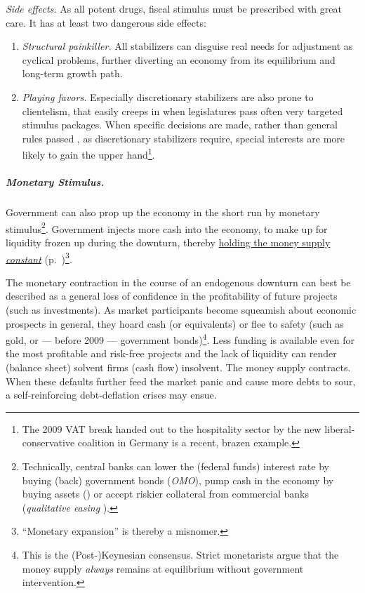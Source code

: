 \emph{Side effects.} As all potent drugs, fiscal stimulus must be prescribed with great care. It has at least two dangerous side effects:
\begin{enumerate}
	\item \emph{Structural painkiller.} All stabilizers can disguise real needs for adjustment as cyclical problems, further diverting an economy from its equilibrium and long-term growth path.  
	\item \emph{Playing favors.} Especially discretionary stabilizers are also prone to clientelism, that easily creeps in when legislatures pass often very targeted stimulus packages. When specific decisions are made, rather than general rules passed \citep{Weber-1918-aa}, as discretionary stabilizers require, special interests are more likely to gain the upper hand\footnote{
		The 2009 VAT break handed out to the hospitality sector by the new liberal-conservative coalition in Germany is a recent, brazen example.}.
\end{enumerate}

\subparagraph{Monetary Stimulus.}  \label{sec:monetary-stimulus}
Government can also prop up the economy in the short run by monetary stimulus\footnote{
	Technically, central banks can lower the (federal funds) interest rate by buying (back) government bonds (\emph{\gls{OMO}}), pump cash in the economy by buying assets () or accept riskier collateral from commercial banks (\emph{qualitative easing} \citep{Buiter2008}).}. 
Government injects more cash into the economy, to make up for liquidity frozen up during the downturn, thereby \hyperref[sec:price-stability]{holding the money supply \emph{constant}} (p.~\pageref{sec:price-stability})\footnote{
	``Monetary expansion'' is thereby a misnomer.}.

The monetary contraction in the course of an endogenous downturn can best be described as a general loss of confidence in the profitability of future projects (such as investments). As market participants become squeamish about economic prospects in general, they hoard cash (or equivalents) or flee to safety (such as gold, or --- before 2009 --- government bonds)\footnote{
	This is the (Post-)Keynesian consensus. Strict monetarists argue that the money supply \emph{always} remains at equilibrium without government intervention.}. 
Less funding is available even for the most profitable and risk-free projects and the lack of liquidity can render (balance sheet) solvent firms (cash flow) insolvent. The money supply contracts. When these defaults further feed the market panic and cause more debts to sour, a self-reinforcing debt-deflation crises may ensue. %

